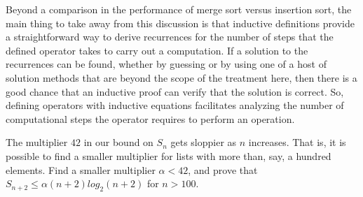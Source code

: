 Beyond a comparison in the performance of merge sort
versus insertion sort, the main thing to take away from this discussion
is that inductive definitions provide a straightforward way to
derive recurrences for the number of steps that the defined operator
takes to carry out a computation.
If a solution to the recurrences can be found,
whether by guessing or by using one of a host of solution methods
that are beyond the scope of the treatment here, 
then there is a good chance that an inductive proof
can verify that the solution is correct.
So, defining operators with inductive equations 
facilitates analyzing the number of computational
steps the operator requires to perform an operation.

\begin{ExerciseList}

\Exercise
The multiplier $42$ in our bound on $S_n$ gets sloppier as $n$ increases.
That is, it is possible to find a smaller multiplier
for lists with more than, say, a hundred elements.
Find a smaller multiplier $\alpha < 42$, and prove that
$S_{n+2} \leq \alpha(n+2)log_2(n+2)$ for $n > 100$.

\end{ExerciseList} 